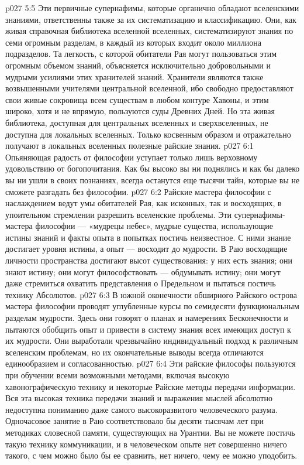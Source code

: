 \vs p027 5:5 Эти первичные супернафимы, которые органично обладают вселенскими знаниями, ответственны также за их систематизацию и классификацию. Они, как живая справочная библиотека вселенной вселенных, систематизируют знания по семи огромным разделам, в каждый из которых входит около миллиона подразделов. Та легкость, с которой обитатели Рая могут пользоваться этим огромным объемом знаний, объясняется исключительно добровольными и мудрыми усилиями этих хранителей знаний. Хранители являются также возвышенными учителями центральной вселенной, ибо свободно предоставляют свои живые сокровища всем существам в любом контуре Хавоны, и этим широко, хотя и не впрямую, пользуются суды Древних Дней. Но эта живая библиотека, доступная для центральных вселенных и сверхвселенных, не доступна для локальных вселенных. Только косвенным образом и отражательно получают в локальных вселенных полезные райские знания.
\vs p027 6:1 Опьяняющая радость от философии уступает только лишь верховному удовольствию от богопочитания. Как бы высоко вы ни поднялись и как бы далеко вы ни ушли в своих познаниях, всегда останутся еще тысячи тайн, которые вы не сможете разгадать без философии.
\vs p027 6:2 Райские мастера философии с наслаждением ведут умы обитателей Рая, как исконных, так и восходящих, в упоительном стремлении разрешить вселенские проблемы. Эти супернафимы\hyp{}мастера философии --- «мудрецы небес», мудрые существа, использующие истины знаний и факты опыта в попытках постичь неизвестное. С ними знание достигает уровня истины, а опыт --- восходит до мудрости. В Раю восходящие личности пространства достигают высот существования: у них есть знания; они знают истину; они могут философствовать --- обдумывать истину; они могут даже стремиться охватить представления о Предельном и пытаться постичь технику Абсолютов.
\vs p027 6:3 В южной оконечности обширного Райского острова мастера философии проводят углубленные курсы по семидесяти функциональным разделам мудрости. Здесь они говорят о планах и намерениях Бесконечности и пытаются обобщить опыт и привести в систему знания всех имеющих доступ к их мудрости. Они выработали чрезвычайно индивидуальный подход к различным вселенским проблемам, но их окончательные выводы всегда отличаются единообразием и согласованностью.
\vs p027 6:4 Эти райские философы пользуются при обучении всеми возможными методами, включая высокую хавонографическую технику и некоторые Райские методы передачи информации. Вся эта высокая техника передачи знаний и выражения мыслей абсолютно недоступна пониманию даже самого высокоразвитого человеческого разума. Одночасовое занятие в Раю соответствовало бы десяти тысячам лет при методиках словесной памяти, существующих на Урантии. Вы не можете постичь такую технику коммуникации, и в человеческом опыте нет совершенно ничего такого, с чем можно было бы ее сравнить, нет ничего, чему ее можно уподобить.
